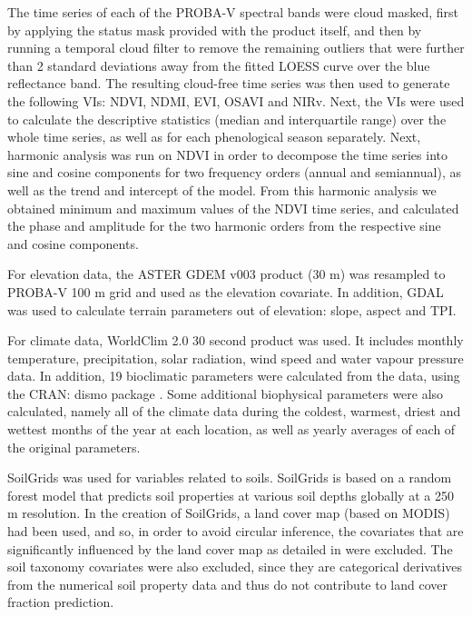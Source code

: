 \documentclass[review,authoryear,3p]{elsarticle}
\newcommand{\cran}[1]{CRAN: #1}
\begin{document}
The time series of each of the PROBA-V spectral bands were cloud masked, first by applying the status mask provided with the product itself, and then by running a temporal cloud filter to remove the remaining outliers that were further than 2 standard deviations away from the fitted \ac{LOESS} curve over the blue reflectance band.
The resulting cloud-free time series was then used to generate the following \glspl{VI}: \gls{NDVI}, \gls{NDMI}, \gls{EVI}, \gls{OSAVI} and \gls{NIRv}. Next, the \glspl{VI} were used to calculate the descriptive statistics (median and interquartile range) over the whole time series, as well as for each phenological season separately.
Next, harmonic analysis \citep{jakubauskas2001harmonic} was run on NDVI in order to decompose the time series into sine and cosine components for two frequency orders (annual and semiannual), as well as the trend and intercept of the model.
From this harmonic analysis we obtained minimum and maximum values of the \gls{NDVI} time series, and calculated the phase and amplitude for the two harmonic orders from the respective sine and cosine components.

For elevation data, the ASTER GDEM v003 \citep{ASTGTM003} product (30 m) was resampled to PROBA-V 100 m grid and used as the elevation covariate.
In addition, \gls{GDAL} \citep{gdal} was used to calculate terrain parameters out of elevation: slope, aspect and \ac{TPI}.

For climate data, WorldClim 2.0 30 second product \citep{worldclim2} was used.
It includes monthly temperature, precipitation, solar radiation, wind speed and water vapour pressure data.
In addition, 19 bioclimatic parameters were calculated from the data, using the \cran{dismo} package \citep{dismo}.
Some additional biophysical parameters were also calculated, namely all of the climate data during the coldest, warmest, driest and wettest months of the year at each location, as well as yearly averages of each of the original parameters.

SoilGrids \citep{hengl_soilgrids250m_2017} was used for variables related to soils.
SoilGrids is based on a random forest model that predicts soil properties at various soil depths globally at a 250 m resolution.
In the creation of SoilGrids, a land cover map (based on MODIS) had been used, and so, in order to avoid circular inference, the covariates that are significantly influenced by the land cover map as detailed in \citet{hengl_soilgrids250m_2017} were excluded.
The soil taxonomy covariates were also excluded, since they are categorical derivatives from the numerical soil property data and thus do not contribute to land cover fraction prediction.
\end{document}
